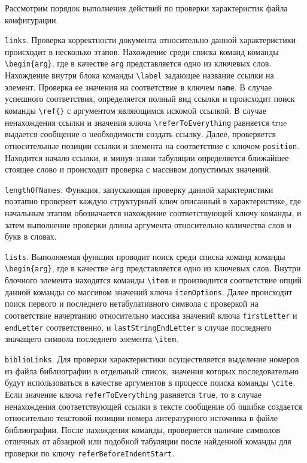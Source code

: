     Рассмотрим порядок выполнения действий по проверки характеристик файла конфигурации.
    
    \verb|links|. Проверка корректности документа относительно данной характеристики происходит в несколько этапов. Нахождение среди списка команд команды \verb|\begin{arg}|, где в качестве \verb|arg| представляется одно из ключевых слов. Нахождение внутри блока команды \verb|\label| задающее название ссылки на элемент. Проверка ее значения на соответствие в ключем \verb|name|. В случае успешного соответствия, определяется полный вид ссылки и происходит поиск команды \verb|\ref{}| с аргументом являющимся искомой ссылкой. В случае ненахождения ссылки и значения ключа \verb|\referToEverything| равняется true выдается сообщение о необходимости создать ссылку. Далее, проверяется относительные позиции ссылки и элемента на соответствие с ключом \verb|position|. Находится начало ссылки, и минуя знаки табуляции определяется ближайшее стоящее слово и происходит проверка с массивом допустимых значений. 

    \verb|lengthOfNames|. Функция, запускающая проверку данной характеристики поэтапно проверяет каждую структурный ключ описанный в характеристике, где начальным этапом обозначается нахождение соответствующей ключу команды, и затем выполнение проверки длины аргумента относительно количества слов и букв в словах.

    \verb|lists|. Выполняемая функция проводит поиск среди списка команд команды \verb|\begin{arg}|, где в качестве \verb|arg| представляется одно из ключевых слов. Внутри блочного элемента находятся команды \verb|\item| и производится соответствие опций данной команды со массивом значений ключа \verb|itemOptions|. Далее происходит поиск первого и последнего нетабулативного символа с проверкой на соответствие начертанию относительно массива значений ключа \verb|firstLetter| и \verb|endLetter| соответственно, и \verb|lastStringEndLetter| в случае последнего значащего символа последнего элемента \verb|\item|.

     \verb|biblioLinks|. Для проверки характеристики осуществляется выделение номеров из файла библиографии в отдельный список, значения которых последовательно будут использоваться в качестве аргументов в процессе поиска команды \verb|\cite|. Если значение ключа \verb|referToEverything| равняется \verb|true|, то в случае ненахождения соответствующей ссылки в тексте сообщение об ошибке создается относительно текстовой позиции номера литературного источника в файле библиографии. После нахождения команды, проверяется наличие символов отличных от абзацной или подобной табуляции после найденной команды для проверки по ключу \verb|referBeforeIndentStart|. 

